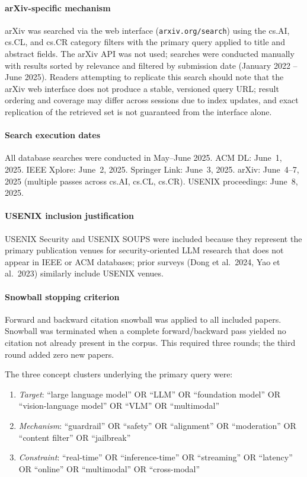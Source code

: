 \paragraph{arXiv-specific mechanism}
arXiv was searched via the web interface (\texttt{arxiv.org/search}) using the cs.AI, cs.CL, and cs.CR category filters with the primary query applied to title and abstract fields.
The arXiv API was not used; searches were conducted manually with results sorted by relevance and filtered by submission date (January 2022 -- June 2025).
Readers attempting to replicate this search should note that the arXiv web interface does not produce a stable, versioned query URL; result ordering and coverage may differ across sessions due to index updates, and exact replication of the retrieved set is not guaranteed from the interface alone.

\paragraph{Search execution dates}
All database searches were conducted in May--June 2025.
ACM DL: June~1, 2025.
IEEE Xplore: June~2, 2025.
Springer Link: June~3, 2025.
arXiv: June~4--7, 2025 (multiple passes across cs.AI, cs.CL, cs.CR).
USENIX proceedings: June~8, 2025.

\paragraph{USENIX inclusion justification}
USENIX Security and USENIX SOUPS were included because they represent the primary publication venues for security-oriented LLM research that does not appear in IEEE or ACM databases; prior surveys (Dong et al.\ 2024, Yao et al.\ 2023) similarly include USENIX venues.

\paragraph{Snowball stopping criterion}
Forward and backward citation snowball was applied to all included papers.
Snowball was terminated when a complete forward/backward pass yielded no citation not already present in the corpus.
This required three rounds; the third round added zero new papers.

The three concept clusters underlying the primary query were:

\begin{enumerate}
  \item \textit{Target}: ``large language model'' OR ``LLM'' OR ``foundation model''
        OR ``vision-language model'' OR ``VLM'' OR ``multimodal''
  \item \textit{Mechanism}: ``guardrail'' OR ``safety'' OR ``alignment'' OR
        ``moderation'' OR ``content filter'' OR ``jailbreak''
  \item \textit{Constraint}: ``real-time'' OR ``inference-time'' OR ``streaming'' OR
        ``latency'' OR ``online'' OR ``multimodal'' OR ``cross-modal''
\end{enumerate}

